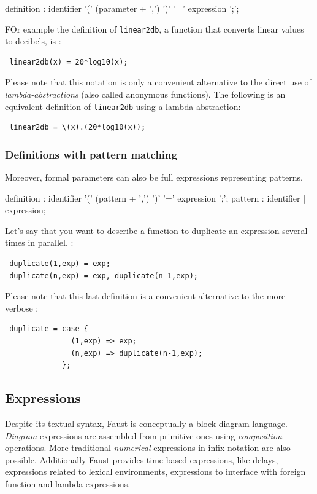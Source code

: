 \documentclass{article}
\begin{document}
\begin{rail}
definition  : identifier '(' (parameter + ',')  ')' '=' expression ';';
\end{rail} 

FOr example the definition of \lstinline'linear2db', a function that converts linear values to decibels, is :

\begin{lstlisting}
 linear2db(x) = 20*log10(x);
\end{lstlisting}
 
Please note that this notation is only a convenient alternative to the direct use of \textit{lambda-abstractions} (also called anonymous functions). The following is an equivalent definition of \lstinline'linear2db' using a lambda-abstraction:

\begin{lstlisting}
 linear2db = \(x).(20*log10(x));
\end{lstlisting}


\subsubsection{Definitions with pattern matching}

Moreover, formal parameters can also be full expressions representing patterns. 
\begin{rail}
definition  : identifier '(' (pattern + ',')  ')' '=' expression ';';
pattern : identifier | expression; 
\end{rail}

Let's say that you want to describe a function to duplicate an expression several times in parallel.  :
\begin{lstlisting}
 duplicate(1,exp) = exp;
 duplicate(n,exp) = exp, duplicate(n-1,exp);
\end{lstlisting}

Please note that this last definition is a convenient alternative to the more verbose :
\begin{lstlisting}
 duplicate = case { 
               (1,exp) => exp; 
               (n,exp) => duplicate(n-1,exp); 
             };
\end{lstlisting}

 
  
\subsection{Expressions}

Despite its textual syntax, Faust is conceptually a block-diagram language. \textit{Diagram} expressions are assembled from primitive ones using \textit{composition} operations. More traditional \textit{numerical} expressions in infix notation are also possible. Additionally Faust provides time based expressions, like delays, expressions related to lexical environments, expressions to interface with foreign function and lambda expressions.
\end{document}
